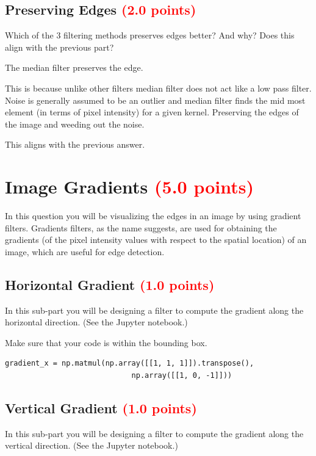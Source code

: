 \documentclass[answers]{exam}
\newcommand{\mypoints}[1]{\textcolor{red}{(#1 points)}}
\begin{document}
\subsection{Preserving Edges \mypoints{2.0}}
Which of the 3 filtering methods preserves edges better? And why? Does this align with the previous part?
\begin{solution}
The median filter preserves the edge. 

This is because unlike other filters median filter does not act like a low pass filter. Noise is generally assumed to be an outlier and median filter finds the mid most element (in terms of pixel intensity) for a given kernel. Preserving the edges of the image and weeding out the noise.

This aligns with the previous answer.

\end{solution}

\newpage
\section{Image Gradients \mypoints{5.0}}
In this question you will be visualizing the edges in an image by using gradient filters. Gradients filters, as the name suggests, are used for obtaining the gradients (of the pixel intensity values with respect to the spatial location) of an image, which are useful for edge detection.

\subsection{Horizontal Gradient \mypoints{1.0}}
In this sub-part you will be designing a filter to compute the gradient along the horizontal direction.
(See the Jupyter notebook.) 

Make sure that your code is within the bounding box.
\begin{solution}
\begin{verbatim}
gradient_x = np.matmul(np.array([[1, 1, 1]]).transpose(),
                             np.array([[1, 0, -1]]))
\end{verbatim}
\end{solution}

\subsection{Vertical Gradient \mypoints{1.0}}
In this sub-part you will be designing a filter to compute the gradient along the vertical direction.
(See the Jupyter notebook.) 
\end{document}
